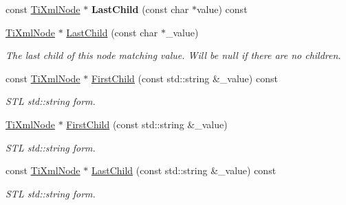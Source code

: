 \begin{DoxyCompactItemize}
\mbox{\label{class_ti_xml_node_afdd7b6ba456fdd570610c1d841f91eb3}} 
const \hyperlink{class_ti_xml_node}{Ti\+Xml\+Node} $\ast$ {\bfseries Last\+Child} (const char $\ast$value) const
\item 
\mbox{\label{class_ti_xml_node_abad5bf1059c48127b958711ef89e8e5d}} 
\hyperlink{class_ti_xml_node}{Ti\+Xml\+Node} $\ast$ \hyperlink{class_ti_xml_node_abad5bf1059c48127b958711ef89e8e5d}{Last\+Child} (const char $\ast$\+\_\+value)
\begin{DoxyCompactList}\small\item\em The last child of this node matching \textquotesingle{}value\textquotesingle{}. Will be null if there are no children. \end{DoxyCompactList}\item 
\mbox{\label{class_ti_xml_node_ab7f52e96c41fca07e81521b5f5ea35b9}} 
const \hyperlink{class_ti_xml_node}{Ti\+Xml\+Node} $\ast$ \hyperlink{class_ti_xml_node_ab7f52e96c41fca07e81521b5f5ea35b9}{First\+Child} (const std\+::string \&\+\_\+value) const
\begin{DoxyCompactList}\small\item\em S\+TL std\+::string form. \end{DoxyCompactList}\item 
\mbox{\label{class_ti_xml_node_a10d2669ccb5e29e02fcb0e4408685ef6}} 
\hyperlink{class_ti_xml_node}{Ti\+Xml\+Node} $\ast$ \hyperlink{class_ti_xml_node_a10d2669ccb5e29e02fcb0e4408685ef6}{First\+Child} (const std\+::string \&\+\_\+value)
\begin{DoxyCompactList}\small\item\em S\+TL std\+::string form. \end{DoxyCompactList}\item 
\mbox{\label{class_ti_xml_node_a96b721f14d5393dac70a0eff0d08520e}} 
const \hyperlink{class_ti_xml_node}{Ti\+Xml\+Node} $\ast$ \hyperlink{class_ti_xml_node_a96b721f14d5393dac70a0eff0d08520e}{Last\+Child} (const std\+::string \&\+\_\+value) const
\begin{DoxyCompactList}\small\item\em S\+TL std\+::string form. \end{DoxyCompactList}\item 

\end{DoxyCompactItemize}
